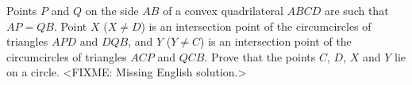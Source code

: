 \problem{}
Points $P$ and $Q$ on the side $AB$ of a convex quadrilateral $ABCD$ are such
that $AP = QB$.
Point $X$ ($X \neq D$) is an intersection point of the circumcircles of
triangles $APD$ and $DQB$, and $Y$ ($Y \neq C$) is an intersection point of the
circumcircles of triangles $ACP$ and $QCB$.
Prove that the points $C$, $D$, $X$ and $Y$ lie on a circle.
\solution
<FIXME: Missing English solution.>
\endproblem
